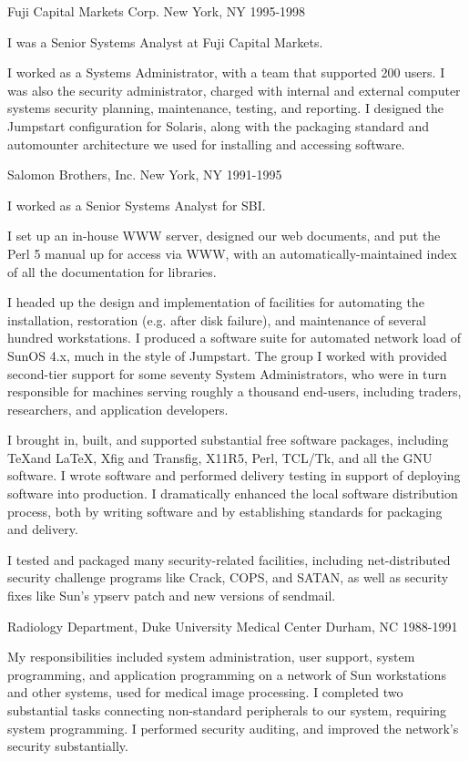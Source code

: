 \documentclass{article}
\begin{document}
Fuji Capital Markets Corp. \hfill New York, NY
1995-1998

I was a Senior Systems Analyst at Fuji Capital Markets.

I worked as a Systems Administrator, with a team that supported
200 users. I was also the security administrator, charged with
internal and external computer systems security planning,
maintenance, testing, and reporting. I designed the Jumpstart
configuration for Solaris, along with the packaging standard and
automounter architecture we used for installing and accessing
software.

Salomon Brothers, Inc. \hfill New York, NY
1991-1995

I worked as a Senior Systems Analyst for SBI.

I set up an in-house WWW server, designed our web documents,
and put the Perl 5 manual up for access via WWW, with an
automatically-maintained index of all the documentation for
libraries.

I headed up the design and implementation of facilities for
automating the installation, restoration (e.g. after disk
failure), and maintenance of several hundred workstations. I
produced a software suite for automated network load of SunOS 4.x,
much in the style of Jumpstart. The group I worked with provided
second-tier support for some seventy System Administrators, who
were in turn responsible for machines serving roughly a thousand
end-users, including traders, researchers, and application
developers.

I brought in, built, and supported substantial free software
packages, including \TeX and \LaTeX, Xfig and Transfig, X11R5,
Perl, TCL/Tk, and all the GNU software. I wrote software and
performed delivery testing in support of deploying software
into production. I dramatically enhanced the local software
distribution process, both by writing software and by establishing
standards for packaging and delivery.

I tested and packaged many security-related facilities, including
net-distributed security challenge programs like Crack, COPS, and
SATAN, as well as security fixes like Sun's ypserv patch and new
versions of sendmail.

Radiology Department, Duke University Medical Center \hfill Durham, NC
1988-1991

My responsibilities included system administration, user
support, system programming, and application programming on a
network of Sun workstations and other systems, used for medical
image processing. I completed two substantial tasks connecting
non-standard peripherals to our system, requiring system
programming. I performed security auditing, and improved the
network's security substantially.
\end{document}
